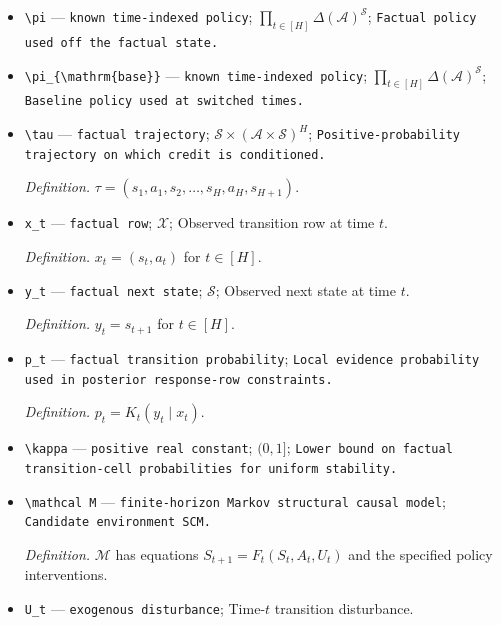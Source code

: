 \documentclass{article}
\begin{document}
\begin{itemize}
  \par\smallskip\noindent\emph{Definition.} \(D=\overline G-\underline G=R\).
  \item \texttt{\textbackslash{}\allowbreak{}pi} --- \texttt{known time-\allowbreak{}indexed policy}; \(\prod_{t\in[H]}\Delta(\mathcal A)^{\mathcal S}\); \texttt{Factual policy used off the factual state.}
  \item \texttt{\textbackslash{}\allowbreak{}pi\_\allowbreak{}\{\textbackslash{}\allowbreak{}mathrm\{base\}\allowbreak{}\}\allowbreak{}} --- \texttt{known time-\allowbreak{}indexed policy}; \(\prod_{t\in[H]}\Delta(\mathcal A)^{\mathcal S}\); \texttt{Baseline policy used at switched times.}
  \item \texttt{\textbackslash{}\allowbreak{}tau} --- \texttt{factual trajectory}; \(\mathcal S\times(\mathcal A\times\mathcal S)^H\); \texttt{Positive-\allowbreak{}probability trajectory on which credit is conditioned.}
  \par\smallskip\noindent\emph{Definition.} \(\tau=(s_1,a_1,s_2,\ldots,s_H,a_H,s_{H+1})\).
  \item \texttt{x\_\allowbreak{}t} --- \texttt{factual row}; \(\mathcal X\); Observed transition row at time \(t\).
  \par\smallskip\noindent\emph{Definition.} \(x_t=(s_t,a_t)\) for \(t\in[H]\).
  \item \texttt{y\_\allowbreak{}t} --- \texttt{factual next state}; \(\mathcal S\); Observed next state at time \(t\).
  \par\smallskip\noindent\emph{Definition.} \(y_t=s_{t+1}\) for \(t\in[H]\).
  \item \texttt{p\_\allowbreak{}t} --- \texttt{factual transition probability}; \texttt{Local evidence probability used in posterior response-\allowbreak{}row constraints.}
  \par\smallskip\noindent\emph{Definition.} \(p_t=K_t(y_t\mid x_t)\).
  \item \texttt{\textbackslash{}\allowbreak{}kappa} --- \texttt{positive real constant}; \((0,1]\); \texttt{Lower bound on factual transition-\allowbreak{}cell probabilities for uniform stability.}
  \item \texttt{\textbackslash{}\allowbreak{}mathcal M} --- \texttt{finite-\allowbreak{}horizon Markov structural causal model}; \texttt{Candidate environment SCM.}
  \par\smallskip\noindent\emph{Definition.} \(\mathcal M\) has equations \(S_{t+1}=F_t(S_t,A_t,U_t)\) and the specified policy interventions.
  \item \texttt{U\_\allowbreak{}t} --- \texttt{exogenous disturbance}; Time-\(t\) transition disturbance.

\end{itemize}
\end{document}
